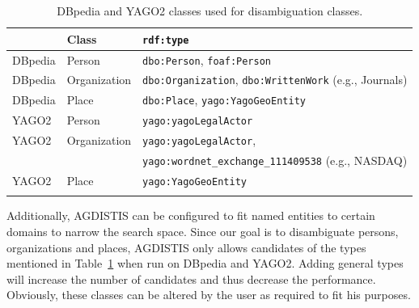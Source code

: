 \begin{table}[t!]
\centering
 \caption{DBpedia  and YAGO2 classes used for disambiguation classes.}
 \begin{tabular}{lll}
	\toprule
\textbf{} & \textbf{Class} & \texttt{\textbf{rdf:type}}\\
\midrule
DBpedia & Person & \texttt{dbo:Person}, \texttt{foaf:Person}\\
DBpedia & Organization & \texttt{dbo:Organization}, \texttt{dbo:WrittenWork} (e.g., Journals) \\
DBpedia & Place & \texttt{dbo:Place}, \texttt{yago:YagoGeoEntity} \\
\midrule
YAGO2 & Person & \texttt{yago:yagoLegalActor}  \\
YAGO2 & Organization & \texttt{yago:yagoLegalActor}, \\
  &   &  \texttt{yago:wordnet\_exchange\_111409538} (e.g., NASDAQ) \\
YAGO2 & Place & \texttt{yago:YagoGeoEntity} \\
\bottomrule
\label{tab:tableOfClasses}
 \end{tabular}
 \end{table}
 
 
Additionally, AGDISTIS can be configured to fit named entities to certain domains to narrow the search space.
Since our goal is to disambiguate persons, organizations and places, AGDISTIS only allows candidates of the types mentioned in Table~\ref{tab:tableOfClasses} when run on DBpedia and YAGO2.
Adding general types will increase the number of candidates and thus decrease the performance.
Obviously, these classes can be altered by the user as required to fit his purposes. 




